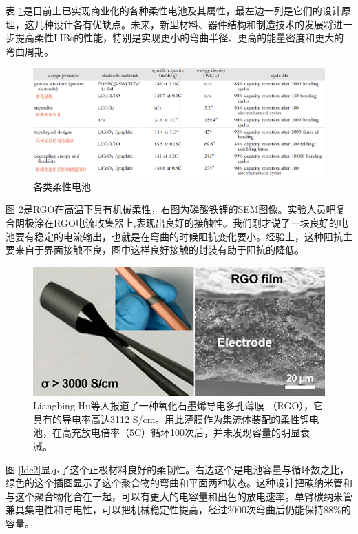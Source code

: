 \documentclass[UTF8,9pt]{ctexart}
\begin{document}
表 \ref{tu2}是目前上已实现商业化的各种柔性电池及其属性，最左边一列是它们的设计原理，这几种设计各有优缺点。未来，新型材料、器件结构和制造技术的发展将进一步提高柔性LIBs的性能，特别是实现更小的弯曲半径、更高的能量密度和更大的弯曲周期。

\begin{figure}[htbp]
    \centering
    \includegraphics[scale=0.3]{1_4.png}
    \caption{各类柔性电池}
    \label{tu2}
\end{figure}

图 \ref{ldc1}是RGO在高温下具有机械柔性，右图为磷酸铁锂的SEM图像。实验人员吧复合阴极涂在RGO电流收集器上,表现出良好的接触性。我们刚才说了一块良好的电池要有稳定的电流输出，也就是在弯曲的时候阻抗变化要小。经验上，这种阻抗主要来自于界面接触不良，图中这样良好接触的封装有助于阻抗的降低。

\begin{figure}[htbp]
    \centering
    \includegraphics[scale=0.5]{16.png}
    \caption{Liangbing Hu等人报道了一种氧化石墨烯导电多孔薄膜 （RGO），它具有的导电率高达3112 S/cm。用此薄膜作为集流体装配的柔性锂电池，在高充放电倍率（5C）循环100次后，并未发现容量的明显衰减。}
    \label{ldc1}
\end{figure}

图 \ref{ldc2}显示了这个正极材料良好的柔韧性。右边这个是电池容量与循环数之比，绿色的这个插图显示了这个聚合物的弯曲和平面两种状态。这种设计把碳纳米管和与这个聚合物化合在一起，可以有更大的电容量和出色的放电速率。单臂碳纳米管兼具集电性和导电性，可以把机械稳定性提高，经过2000次弯曲后仍能保持88\%的容量。
\end{document}

